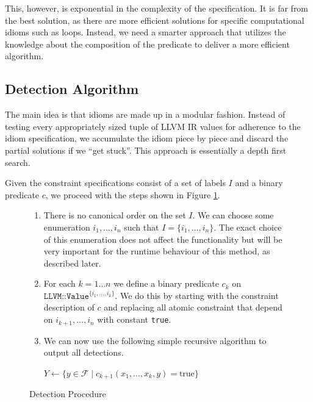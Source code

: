 This, however, is exponential in the complexity of the specification.
It is far from the best solution, as there are  more efficient
solutions for specific computational idioms such as loops.  Instead,
we need a smarter approach that utilizes the knowledge 
about the composition of the predicate to deliver a more efficient
algorithm.

\subsection{Detection Algorithm}
The main idea is that idioms are made up in a modular
fashion.  Instead of testing every appropriately sized tuple of LLVM
IR values for adherence to the idiom specification, we accumulate the
idiom piece by piece and discard the partial solutions if we ``get
stuck''.  This approach is  essentially a
depth first search.

Given the constraint specifications consist of a set of labels $I$ and a binary predicate $c$, we proceed with the steps shown in Figure \ref{Detection}.

\begin{figure}[h]
\begin{enumerate}
\item
There is no canonical order on the set $I$.
We can choose some enumeration $i_1,\dots,i_n$ such that $I=\{i_1,\dots,i_n\}$.
The exact choice of this enumeration does not affect the functionality but will be very important for the runtime behaviour of this method, as described later.

\item
For each $k=1\dots n$ we define a binary predicate $c_k$ on $\texttt{LLVM::Value}^{\{i_1,\dots,i_k\}}$.
We do this by starting with the constraint description of $c$ and replacing all atomic constraint that depend on $i_{k+1},\dots,i_n$ with constant \texttt{true}.

\item
We can now use the following simple recursive algorithm to output all detections.
\begin{algorithmic}[1]
\State{}
\Else
\State$Y\gets\{y\in\mathcal F\mid c_{k+1}(x_1,\dots, x_k, y)=\text{true}\}$
\State {}
\EndFor
\EndIf
\EndProcedure
\end{algorithmic}
\end{enumerate}
\caption{Detection Procedure}
\label{Detection}
\end{figure}


